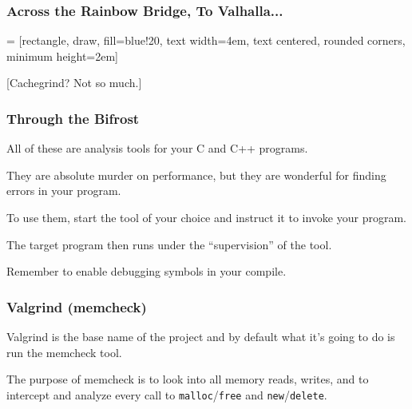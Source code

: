 

\begin{frame}
\frametitle{Across the Rainbow Bridge, To Valhalla...}


 = [rectangle, draw, fill=blue!20, 
    text width=4em, text centered, rounded corners, minimum height=2em]

\begin{center}
\end{center}

\Large
[Cachegrind? Not so much.]





\end{frame}

\begin{frame}
\frametitle{Through the Bifrost}

All of these are analysis tools for your C and C++ programs. 

They are absolute murder on performance, but they are wonderful for finding errors in your program. 

To use them, start the tool of your choice and instruct it to invoke your program. 

The target program then runs under the ``supervision'' of the tool.

Remember to enable debugging symbols in your compile.

\end{frame}

\begin{frame}
\frametitle{Valgrind (memcheck)}

Valgrind is the base name of the project and by default what it's going to do is run the memcheck tool. 

The purpose of memcheck is to look into all memory reads, writes, and to intercept and analyze every call to \texttt{malloc}/\texttt{free} and \texttt{new}/\texttt{delete}.

\end{frame}

